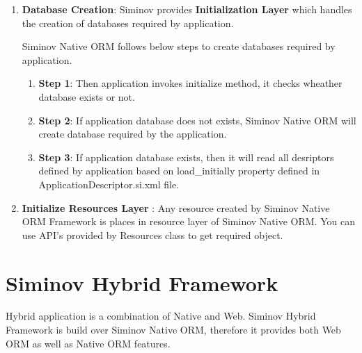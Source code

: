 	\begin{enumerate}

		\item \small \textbf{Database Creation}: Siminov provides \textbf{Initialization Layer} which handles the creation of databases required by application. 

		\par
		Siminov Native ORM follows below steps to create databases required by application.

		\begin{enumerate}

			\item \small \textbf{Step 1}: Then application invokes initialize method, it checks wheather database exists or not.

			\item \small \textbf{Step 2}: If application database does not exists, Siminov Native ORM will create database required by the application.

			\item \small \textbf{Step 3}: If application database exists, then it will read all desriptors defined by application based on load\_initially property defined in ApplicationDescriptor.si.xml file.

		\end{enumerate}

		
		\item \small \textbf{Initialize Resources Layer}	: Any resource created by Siminov Native ORM Framework is places in resource layer of Siminov Native ORM. You can use API's provided by Resources class to get required object.
			
			


	\end{enumerate}



\section{Siminov Hybrid Framework}

Hybrid application is a combination of Native and Web. Siminov Hybrid Framework is build over Siminov Native ORM, therefore it provides both Web ORM as well as Native ORM features.

